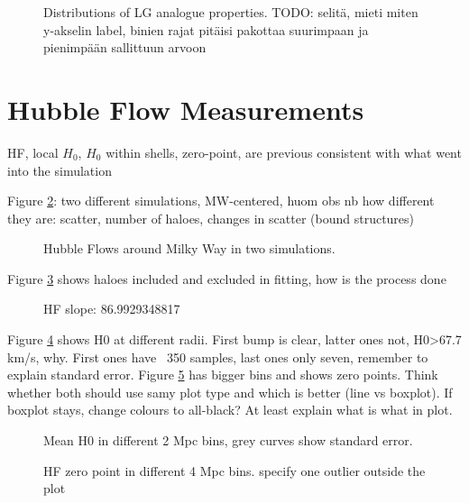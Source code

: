 \documentclass[english, oneside]{HYgradu}
\begin{document}
\begin{figure}
    \centering
    
    \caption{Distributions of LG analogue properties. TODO: selitä, mieti miten y-akselin label, binien rajat pitäisi pakottaa suurimpaan ja pienimpään sallittuun arvoon}\label{fig:LGproperties}
\end{figure}


\section{Hubble Flow Measurements}
HF, local $H_0$, $H_0$ within shells, zero-point, are previous consistent with what went into the simulation

Figure \ref{fig:hubblediagrams}: two different simulations, MW-centered, huom obs nb how different they are: scatter, number of haloes, changes in scatter (bound structures)

\begin{figure}
    \centering
    
    \caption{Hubble Flows around Milky Way in two simulations.}\label{fig:hubblediagrams}
\end{figure}

Figure \ref{fig:hubblefit} shows haloes included and excluded in fitting, how is the process done

\begin{figure}
    \centering
    
    \caption{HF slope: 86.9929348817}\label{fig:hubblefit}
\end{figure}

Figure \ref{fig:shelledH0} shows H0 at different radii. First bump is clear, latter ones not, H0>67.7 km/s, why. First ones have ~350 samples, last ones only seven, remember to explain standard error. Figure \ref{fig:zeros} has bigger bins and shows zero points. Think whether both should use samy plot type and which is better (line vs boxplot). If boxplot stays, change colours to all-black? At least explain what is what in plot.

\begin{figure}
    \centering
    
    \caption{Mean H0 in different 2 Mpc bins, grey curves show standard error.}\label{fig:shelledH0}
\end{figure}

\begin{figure}
    \centering
    
    \caption{HF zero point in different 4 Mpc bins. specify one outlier outside the plot}\label{fig:zeros}
\end{figure}
\end{document}
